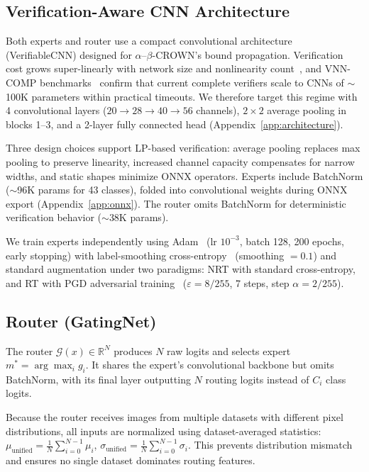 \documentclass[runningheads]{llncs}
\begin{document}
\subsection{Verification-Aware CNN Architecture}

Both experts and router use a compact convolutional architecture (VerifiableCNN) designed for $\alpha$--$\beta$-CROWN's bound propagation. Verification cost grows super-linearly with network size and nonlinearity count~\cite{wang2021}, and VNN-COMP benchmarks~\cite{kaulen2025} confirm that current complete verifiers scale to CNNs of ${\sim}$100K parameters within practical timeouts. We therefore target this regime with 4 convolutional layers ($20 \to 28 \to 40 \to 56$ channels), $2{\times}2$ average pooling in blocks 1--3, and a 2-layer fully connected head (Appendix~\ref{app:architecture}).

Three design choices support LP-based verification: average pooling replaces max pooling to preserve linearity, increased channel capacity compensates for narrow widths, and static shapes minimize ONNX operators. Experts include BatchNorm (${\sim}$96K params for 43 classes), folded into convolutional weights during ONNX export (Appendix~\ref{app:onnx}). The router omits BatchNorm for deterministic verification behavior (${\sim}$38K params).

We train experts independently using Adam~\cite{kingma2015adam} (lr $10^{-3}$, batch 128, 200 epochs, early stopping) with label-smoothing cross-entropy~\cite{szegedy2016labelsmoothing} (smoothing $= 0.1$) and standard augmentation under two paradigms: NRT with standard cross-entropy, and RT with PGD adversarial training~\cite{madry2018,zhang2019trades} ($\varepsilon = 8/255$, 7 steps, step $\alpha = 2/255$).

\subsection{Router (GatingNet)}

The router $\mathcal{G}(x) \in \mathbb{R}^N$ produces $N$ raw logits and selects expert $m^* = \arg\max_i g_i$. It shares the expert's convolutional backbone but omits BatchNorm, with its final layer outputting $N$ routing logits instead of $C_i$ class logits.

Because the router receives images from multiple datasets with different pixel distributions, all inputs are normalized using dataset-averaged statistics: $\mu_{\text{unified}} = \frac{1}{N} \sum_{i=0}^{N-1} \mu_i$, $\sigma_{\text{unified}} = \frac{1}{N} \sum_{i=0}^{N-1} \sigma_i$. This prevents distribution mismatch and ensures no single dataset dominates routing features.
\end{document}
